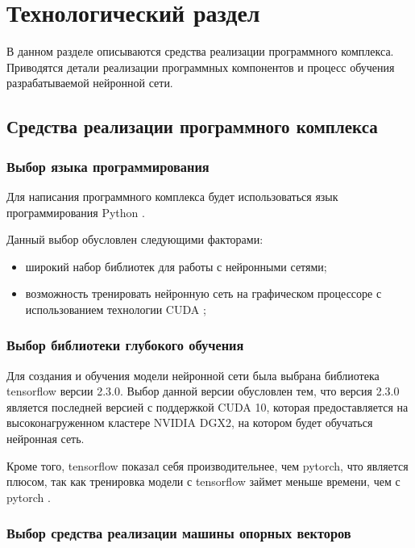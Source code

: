\section{Технологический раздел}

В данном разделе описываются средства реализации программного комплекса. Приводятся детали реализации программных компонентов и процесс обучения разрабатываемой нейронной сети.

\subsection{Средства реализации программного комплекса}

\subsubsection{Выбор языка программирования}

Для написания программного комплекса будет использоваться язык программирования Python \cite{python}.

Данный выбор обусловлен следующими факторами:
\begin{itemize}
	\item широкий набор библиотек для работы с нейронными сетями;
	\item возможность тренировать нейронную сеть на графическом процессоре с использованием технологии CUDA \cite{cuda};
\end{itemize}

\subsubsection{Выбор библиотеки глубокого обучения}

Для создания и обучения модели нейронной сети была выбрана библиотека tensorflow \cite{tensorflow} версии 2.3.0. Выбор данной версии обусловлен тем, что версия 2.3.0 является последней версией с поддержкой CUDA 10, которая предоставляется на высоконагруженном кластере NVIDIA DGX2, на котором будет обучаться нейронная сеть.

Кроме того, tensorflow показал себя производительнее, чем pytorch, что является плюсом, так как тренировка модели с tensorflow займет меньше времени, чем с pytorch \cite{ptvstf}.

\subsubsection{Выбор средства реализации машины опорных векторов}

